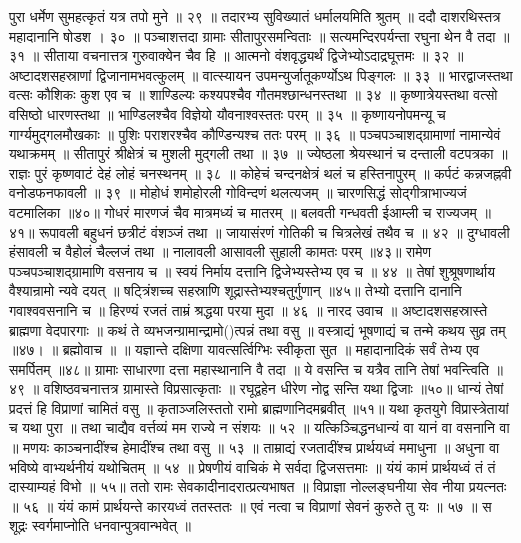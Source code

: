 पुरा धर्मेण सुमहत्कृतं यत्र तपो मुने ॥ २९ ॥
तदारभ्य सुविख्यातं धर्मालयमिति
श्रुतम् ॥ ददौ दाशरथिस्तत्र महादानानि षोडश । ३० ॥
पञ्चाशत्तदा ग्रामाः सीतापुरसमन्विताः ॥
सत्यमन्दिरपर्यन्ता रघुना थेन वै तदा ॥ ३१ ॥
सीताया वचनात्तत्र गुरुवाक्येन चैव हि ॥
आत्मनो वंशवृद्ध्यर्थं द्विजेभ्योऽदाद्रघूत्तमः ॥ ३२ ॥
अष्टादशसहस्राणां द्विजानामभवत्कुलम् ॥
वात्स्यायन उपमन्युर्जातूकर्ण्योऽथ पिङ्गलः ॥ ३३ ॥
भारद्वाजस्तथा वत्सः कौशिकः कुश एव च ॥
शाण्डिल्यः कश्यपश्चैव गौतमश्छान्धनस्तथा ॥ ३४ ॥
कृष्णात्रेयस्तथा वत्सो वसिष्ठो धारणस्तथा ॥
भाण्डिलश्चैव विज्ञेयो यौवनाश्वस्ततः परम् ॥ ३५ ॥
कृष्णायनोपमन्यू च गार्ग्यमुद्गलमौखकाः ॥
पुशिः पराशरश्चैव कौण्डिन्यश्च ततः परम् ॥ ३६ ॥
पञ्चपञ्चाशद्ग्रामाणां नामान्येवं यथाक्रमम् ॥
सीतापुरं श्रीक्षेत्रं च मुशली मुद्गली तथा ॥ ३७ ॥
ज्येष्ठला श्रेयस्थानं च दन्ताली वटपत्रका ॥
राज्ञः पुरं कृष्णवाटं देहं लोहं चनस्थनम् ॥ ३८ ॥
कोहेचं चन्दनक्षेत्रं थलं च हस्तिनापुरम् ॥
कर्पटं कन्नजह्नवी वनोडफनफावली ॥ ३९ ॥
मोहोधं शमोहोरली गोविन्दणं थलत्यजम् ॥
चारणसिद्धं सोद्गीत्राभाज्यजं वटमालिका ॥४०॥
गोधरं मारणजं चैव मात्रमध्यं च मातरम् ॥
बलवती गन्धवती ईआम्ली च राज्यजम् ॥४१॥
रूपावली बहुधनं छत्रीटं वंशञ्जं तथा ॥
जायासंरणं गोतिकी च चित्रलेखं तथैव च ॥ ४२ ॥
दुग्धावली हंसावली च वैहोलं चैल्लजं तथा ॥
नालावली आसावली सुहाली कामतः परम् ॥४३॥
रामेण पञ्चपञ्चाशद्ग्रामाणि वसनाय च ॥
स्वयं निर्माय दत्तानि द्विजेभ्यस्तेभ्य एव च ॥ ४४ ॥
तेषां शुश्रूषणार्थाय वैश्यान्रामो न्यवे दयत् ॥
षट्त्रिंशच्च सहस्राणि शूद्रास्तेभ्यश्चतुर्गुणान् ॥४५॥
तेभ्यो दत्तानि दानानि गवाश्ववसनानि च ॥
हिरण्यं रजतं ताम्रं श्रद्धया परया मुदा ॥ ४६ ॥
नारद उवाच ॥
अष्टादशसहस्रास्ते ब्राह्मणा वेदपारगाः ॥
कथं ते व्यभजन्ग्रामान्द्रामो()त्पन्नं तथा वसु ॥
वस्त्राद्यं भूषणाद्यं च तन्मे कथय सुव्र तम् ॥४७। ॥
ब्रह्मोवाच ॥ ॥
यज्ञान्ते दक्षिणा यावत्सर्त्विग्भिः स्वीकृता सुत ॥
महादानादिकं सर्वं तेभ्य एव समर्पितम् ॥४८॥
ग्रामाः साधारणा दत्ता महास्थानानि वै तदा ॥
ये वसन्ति च यत्रैव तानि तेषां भवन्त्विति ॥ ४९ ॥
वशिष्ठवचनात्तत्र ग्रामास्ते विप्रसात्कृताः ॥
रघूद्वहेन धीरेण नोद्व सन्ति यथा द्विजाः ॥५०॥
धान्यं तेषां प्रदत्तं हि विप्राणां चामितं वसु ॥
कृताञ्जलिस्ततो रामो ब्राह्मणानिदमब्रवीत् ॥५१॥
यथा कृतयुगे विप्रास्त्रेतायां च यथा पुरा ॥
तथा चाद्यैव वर्त्तव्यं मम राज्ये न संशयः ॥ ५२ ॥
यत्किञ्चिद्धनधान्यं वा यानं वा वसनानि वा ॥
मणयः काञ्चनादींश्च हेमादींश्च तथा वसु ॥ ५३ ॥
ताम्राद्यं रजतादींश्च प्रार्थयध्वं ममाधुना ॥
अधुना वा भविष्ये वाभ्यर्थनीयं यथोचितम् ॥ ५४ ॥
प्रेषणीयं वाचिकं मे सर्वदा द्विजसत्तमाः ॥
यंयं कामं प्रार्थयध्वं तं तं दास्याम्यहं विभो ॥ ५५॥
ततो रामः सेवकादीनादरात्प्रत्यभाषत ॥
विप्राज्ञा नोल्लङ्घनीया सेव नीया प्रयत्नतः ॥ ५६ ॥
यंयं कामं प्रार्थयन्ते कारयध्वं ततस्ततः ॥
एवं नत्वा च विप्राणां सेवनं कुरुते तु यः ॥ ५७ ॥
स शूद्रः स्वर्गमाप्नोति धनवान्पुत्रवान्भवेत् ॥
